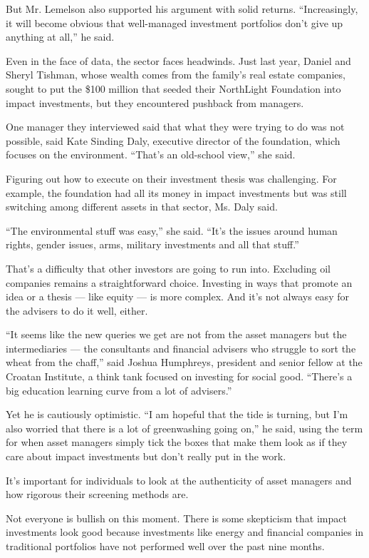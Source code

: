 But Mr. Lemelson also supported his argument with solid returns.
``Increasingly, it will become obvious that well-managed investment
portfolios don't give up anything at all,'' he said.

Even in the face of data, the sector faces headwinds. Just last year,
Daniel and Sheryl Tishman, whose wealth comes from the family's real
estate companies, sought to put the \$100 million that seeded their
NorthLight Foundation into impact investments, but they encountered
pushback from managers.

One manager they interviewed said that what they were trying to do was
not possible, said Kate Sinding Daly, executive director of the
foundation, which focuses on the environment. ``That's an old-school
view,'' she said.

Figuring out how to execute on their investment thesis was challenging.
For example, the foundation had all its money in impact investments but
was still switching among different assets in that sector, Ms. Daly
said.

``The environmental stuff was easy,'' she said. ``It's the issues around
human rights, gender issues, arms, military investments and all that
stuff.''

That's a difficulty that other investors are going to run into.
Excluding oil companies remains a straightforward choice. Investing in
ways that promote an idea or a thesis --- like equity --- is more
complex. And it's not always easy for the advisers to do it well,
either.

``It seems like the new queries we get are not from the asset managers
but the intermediaries --- the consultants and financial advisers who
struggle to sort the wheat from the chaff,'' said Joshua Humphreys,
president and senior fellow at the Croatan Institute, a think tank
focused on investing for social good. ``There's a big education learning
curve from a lot of advisers.''

Yet he is cautiously optimistic. ``I am hopeful that the tide is
turning, but I'm also worried that there is a lot of greenwashing going
on,'' he said, using the term for when asset managers simply tick the
boxes that make them look as if they care about impact investments but
don't really put in the work.

It's important for individuals to look at the authenticity of asset
managers and how rigorous their screening methods are.

Not everyone is bullish on this moment. There is some skepticism that
impact investments look good because investments like energy and
financial companies in traditional portfolios have not performed well
over the past nine months.

